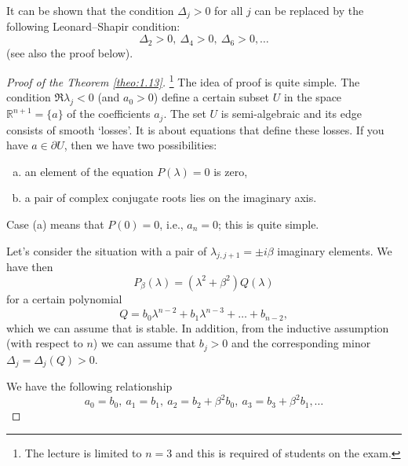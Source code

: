 \begin{remark}
	It can be shown  that the condition $\Delta_j > 0$ for all $j$ can be replaced by the following Leonard–Shapir condition:
	$$\Delta_2 > 0,\ \Delta_4 > 0,\ \Delta_6 > 0, \ldots$$
	(see also the proof below).
\end{remark}

\begin{proof}[Proof of the Theorem \ref{theo:1.13}]\footnote{The lecture is limited to $n = 3$ and this is required of students on the exam.}
	The idea of proof is quite simple. The condition $\Re\lambda_j < 0$ (and $a_0> 0$) define a certain subset $U$ in the space $\mathbb{R}^{n+1} = \{a\}$ of the coefficients $a_j$. The set $U$ is semi-algebraic and its edge consists of smooth `losses'. It is about equations that define these losses. If you have $a\in\partial U$, then we have two possibilities:
	\begin{enumerate}[(a)]
		\item an element of the equation $P(\lambda) = 0$ is zero,
		\item a pair of complex conjugate roots lies on the imaginary axis.
	\end{enumerate}

Case (a) means that $P (0) = 0$, i.e., $a_n = 0$; this is quite simple.

Let's consider the situation with a pair of $\lambda_{j,j+1} = \pm i\beta$ imaginary elements. We have then
\begin{equation}\label{1.9}
	P_{\beta}(\lambda) = (\lambda^2 + \beta^2)Q(\lambda)
\end{equation}
for a certain polynomial
$$Q = b_0\lambda^{n-2} + b_1\lambda^{n-3} + \ldots + b_{n-2},$$
which we can assume that is stable. In addition, from the inductive assumption (with respect to $n$) we can assume that $b_j> 0$ and the corresponding minor $\Delta_j = \Delta_j(Q) > 0$.

We have the following relationship
$$a_0 = b_0,\ a_1=b_1,\ a_2 = b_2 + \beta^2 b_0,\ a_3 = b_3 + \beta^2b_1, \ldots$$


\end{proof}
